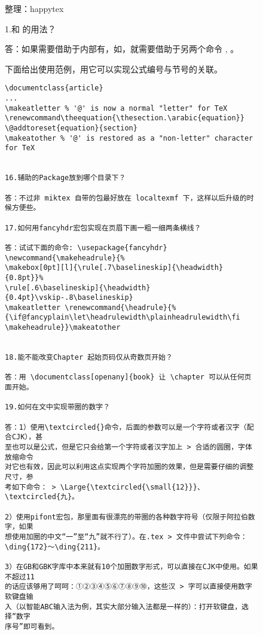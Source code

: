 \begin{center}
\begin{figure}[t]
整理：happytex 
 
1.\makeatletter 和 \makeatother 的用法？ 
 
答：如果需要借助于内部有，如\@addtoreset，就需要借助于另两个命令 
\makeatletter, \makeatother。 
 
下面给出使用范例，用它可以实现公式编号与节号的关联。 
\begin{verbatim} 
\documentclass{article} 
... 
\makeatletter % '@' is now a normal "letter" for TeX
\renewcommand\theequation{\thesection.\arabic{equation}} 
\@addtoreset{equation}{section} 
\makeatother % '@' is restored as a "non-letter" character for TeX

 
16.辅助的Package放到哪个目录下？ 
 
答：不过非 miktex 自带的包最好放在 localtexmf 下，这样以后升级的时候方便些。 
 
17.如何用fancyhdr宏包实现在页眉下画一粗一细两条横线？ 
 
答：试试下面的命令: \usepackage{fancyhdr} 
\newcommand{\makeheadrule}{% 
\makebox[0pt][l]{\rule[.7\baselineskip]{\headwidth}{0.8pt}}% 
\rule[.6\baselineskip]{\headwidth}{0.4pt}\vskip-.8\baselineskip} 
\makeatletter \renewcommand{\headrule}{% 
{\if@fancyplain\let\headrulewidth\plainheadrulewidth\fi  
\makeheadrule}}\makeatother 

 
18.能不能改变Chapter 起始页码仅从奇数页开始？ 
 
答：用 \documentclass[openany]{book} 让 \chapter 可以从任何页面开始。 
 
19.如何在文中实现带圈的数字？ 
 
答：1）使用\textcircled{}命令，后面的参数可以是一个字符或者汉字（配合CJK），甚 
至也可以是公式，但是它只会给第一个字符或者汉字加上 > 合适的圆圈，字体放缩命令 
对它也有效，因此可以利用这点实现两个字符加圈的效果，但是需要仔细的调整尺寸，参 
考如下命令： > \Large{\textcircled{\small{12}}}、\textcircled{九}。 
 
2）使用pifont宏包，那里面有很漂亮的带圈的各种数字符号（仅限于阿拉伯数字，如果 
想使用加圈的中文“一”至“九”就不行了）。在.tex > 文件中尝试下列命令： 
\ding{172}～\ding{211}。 
 
3）在GB和GBK字库中本来就有10个加圈数字形式，可以直接在CJK中使用。如果不超过11 
的话应该够用了呵呵：①②③④⑤⑥⑦⑧⑨⑩，这些汉 > 字可以直接使用数字软键盘输 
入（以智能ABC输入法为例，其实大部分输入法都是一样的）：打开软键盘，选择“数字 
序号”即可看到。 
 

\end{verbatim}
\end{figure}
\end{center}
